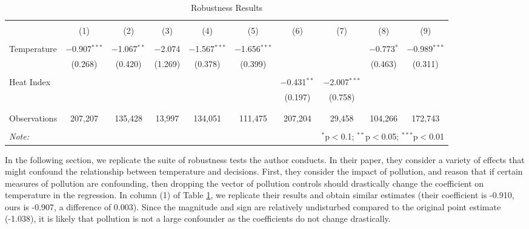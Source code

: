 \documentclass{article}
\begin{document}
	{\setlength{\tabcolsep}{.4pt}
		\begin{table}[h!]
			\caption{Robustness Results}
			\begin{tabular}{@{\extracolsep{5pt}}lccccccccc} 
				\\[-1.8ex]\hline 
				\hline 
				\\[-1.8ex] & (1) & (2) & (3) & (4) & (5) & (6) & (7) & (8) & (9)\\ 
				\hline \\[-1.8ex] 
				Temperature & $-$0.907$^{***}$ & $-$1.067$^{**}$ & $-$2.074 & $-$1.567$^{***}$ & $-$1.656$^{***}$ &  &  & $-$0.773$^{*}$ & $-$0.989$^{***}$ \\ 
				& (0.268) & (0.420) & (1.269) & (0.378) & (0.399) &  &  & (0.463) & (0.311) \\ 
				& & & & & & & & & \\ 
				Heat Index &  &  &  &  &  & $-$0.431$^{**}$ & $-$2.007$^{***}$ &  &  \\ 
				&  &  &  &  &  & (0.197) & (0.758) &  &  \\ 
				& & & & & & & & & \\ 
				\hline \\[-1.8ex] 
				Observations & 207,207 & 135,428 & 13,997 & 134,051 & 111,475 & 207,204 & 29,458 & 104,266 & 172,743 \\ 
				\hline 
				\hline \\[-1.8ex] 
				\textit{Note:}  & \multicolumn{9}{r}{$^{*}$p$<$0.1; $^{**}$p$<$0.05; $^{***}$p$<$0.01} 				
			\end{tabular}
			\label{tab:paper_tab5}
			
	\end{table}}
	
	In the following section, we replicate the suite of robustness tests the author conducts. In their paper, they consider a variety of effects that might confound the relationship between temperature and decisions. First, they consider the impact of pollution, and reason that if certain measures of pollution are confounding, then dropping the vector of pollution controls should drastically change the coefficient on temperature in the regression. In column (1) of Table \ref{tab:paper_tab5}, we replicate their results and obtain similar estimates (their coefficient is -0.910, ours is -0.907, a difference of 0.003). Since the magnitude and sign are relatively undisturbed compared to the original point estimate (-1.038), it is likely that pollution is not a large confounder as the coefficients do not change drastically.
	
\end{document}
